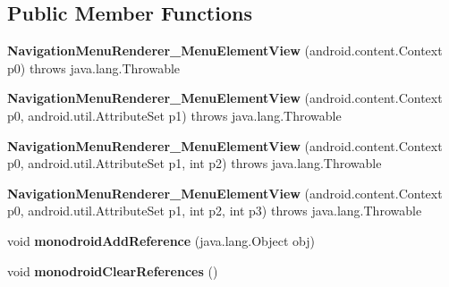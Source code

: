 \subsection*{Public Member Functions}
\begin{DoxyCompactItemize}
\item 
\mbox{\label{classmd5b60ffeb829f638581ab2bb9b1a7f4f3f_1_1_navigation_menu_renderer___menu_element_view_a0c5cb8c6adfb8c38c5cafccdc1af874f}} 
{\bfseries Navigation\+Menu\+Renderer\+\_\+\+Menu\+Element\+View} (android.\+content.\+Context p0)  throws java.\+lang.\+Throwable 	
\item 
\mbox{\label{classmd5b60ffeb829f638581ab2bb9b1a7f4f3f_1_1_navigation_menu_renderer___menu_element_view_aebec519cc030b32200fdeb7e7e7b1a10}} 
{\bfseries Navigation\+Menu\+Renderer\+\_\+\+Menu\+Element\+View} (android.\+content.\+Context p0, android.\+util.\+Attribute\+Set p1)  throws java.\+lang.\+Throwable 	
\item 
\mbox{\label{classmd5b60ffeb829f638581ab2bb9b1a7f4f3f_1_1_navigation_menu_renderer___menu_element_view_a323eade9a3ca095a1c86090dcd3ae204}} 
{\bfseries Navigation\+Menu\+Renderer\+\_\+\+Menu\+Element\+View} (android.\+content.\+Context p0, android.\+util.\+Attribute\+Set p1, int p2)  throws java.\+lang.\+Throwable 	
\item 
\mbox{\label{classmd5b60ffeb829f638581ab2bb9b1a7f4f3f_1_1_navigation_menu_renderer___menu_element_view_ad921ddeb62129b3f4bc0bf30c9f04165}} 
{\bfseries Navigation\+Menu\+Renderer\+\_\+\+Menu\+Element\+View} (android.\+content.\+Context p0, android.\+util.\+Attribute\+Set p1, int p2, int p3)  throws java.\+lang.\+Throwable 	
\item 
\mbox{\label{classmd5b60ffeb829f638581ab2bb9b1a7f4f3f_1_1_navigation_menu_renderer___menu_element_view_addd20286455393e3d32e5f4697d6b870}} 
void {\bfseries monodroid\+Add\+Reference} (java.\+lang.\+Object obj)
\item 
\mbox{\label{classmd5b60ffeb829f638581ab2bb9b1a7f4f3f_1_1_navigation_menu_renderer___menu_element_view_a34c2e11f6c978d883b8411da596cc99d}} 
void {\bfseries monodroid\+Clear\+References} ()
\end{DoxyCompactItemize}
